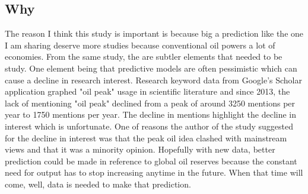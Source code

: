 \documentclass[a4paper,man,biblatex]{apa6}
\begin{document}
\subsection{Why} The reason I think this study is important is because big a prediction like the one I am sharing deserve more studies because conventional oil powers a lot of economies. From the same study, the are subtler elements that needed to be study. One element being that predictive models are often pessimistic which can cause a decline in research interest. Research keyword data from Google's Scholar application graphed "oil peak" usage in scientific literature and since 2013, the lack of mentioning "oil peak" declined from a peak of around 3250 mentions per year to 1750 mentions per year. The decline in mentions highlight the decline in interest which is unfortunate. One of reasons the author of the study suggested for the decline in interest was that the peak oil idea clashed with mainstream views and that it was a minority opinion. Hopefully with new data, better prediction could be made in reference to global oil reserves because the constant need for output has to stop increasing anytime in the future. When that time will come, well, data is needed to make that prediction.

\printbibliography
\end{document}
